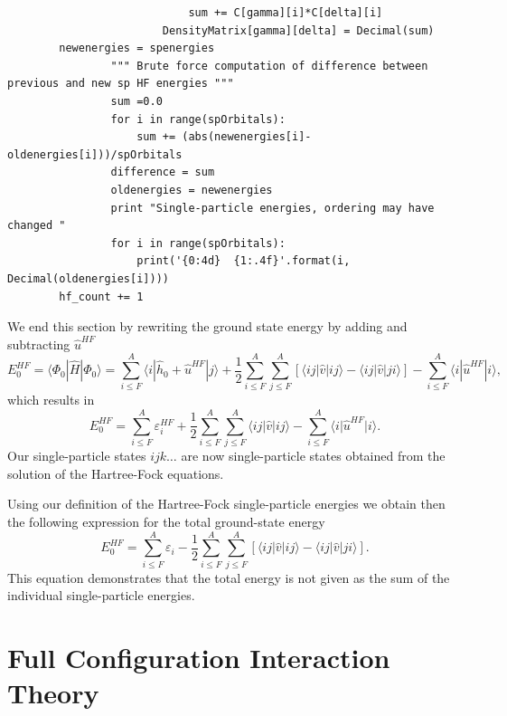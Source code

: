 \begin{lstlisting}
                            sum += C[gamma][i]*C[delta][i]
                        DensityMatrix[gamma][delta] = Decimal(sum)
		newenergies = spenergies
                """ Brute force computation of difference between previous and new sp HF energies """
                sum =0.0
                for i in range(spOrbitals):
                    sum += (abs(newenergies[i]-oldenergies[i]))/spOrbitals
                difference = sum
                oldenergies = newenergies
                print "Single-particle energies, ordering may have changed "
                for i in range(spOrbitals):
                    print('{0:4d}  {1:.4f}'.format(i, Decimal(oldenergies[i])))
		hf_count += 1
\end{lstlisting}





  We end this section by rewriting the ground state energy by adding
  and subtracting $\hat{u}^{HF}$
  \[
    E_0^{HF} =\langle \Phi_0 | \hat{H} | \Phi_0\rangle = \sum_{i\le
      F}^A \langle i | \hat{h}_0 +\hat{u}^{HF}| j\rangle+
    \frac{1}{2}\sum_{i\le F}^A\sum_{j \le F}^A\left[\langle ij
      |\hat{v}|ij \rangle-\langle
      ij|\hat{v}|ji\rangle\right]-\sum_{i\le F}^A \langle i
    |\hat{u}^{HF}| i\rangle,
  \]
  which results in
  \[
    E_0^{HF} = \sum_{i\le F}^A \varepsilon_i^{HF} +
    \frac{1}{2}\sum_{i\le F}^A\sum_{j \le F}^A\langle ij\vert\hat{v}\vert ij \rangle-\sum_{i\le F}^A \langle i\vert\hat{u}^{HF}\vert i\rangle.
  \]
  Our single-particle states $ijk\dots$ are now single-particle states
  obtained from the solution of the Hartree-Fock equations.



  Using our definition of the Hartree-Fock single-particle energies we
  obtain then the following expression for the total ground-state
  energy
  \[
    E_0^{HF} = \sum_{i\le F}^A \varepsilon_i - \frac{1}{2}\sum_{i\le
      F}^A\sum_{j \le F}^A\left[\langle ij |\hat{v}|ij \rangle-\langle
      ij|\hat{v}|ji\rangle\right].
  \]
  This equation demonstrates that the total energy is not given as the
  sum of the individual single-particle energies.

  \section{Full Configuration Interaction Theory}\label{sec:chap8fci}

